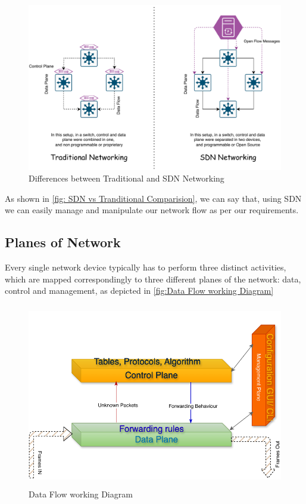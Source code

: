 \documentclass[12pt,letterpaper]{article}
\begin{document}
    \begin{figure}[h]
        \centering
        \includegraphics[height = 12 cm]{images/sndvtra.pdf}
        \caption{Differences between Traditional and SDN Networking}
        \label{fig: SDN vs Tranditional Comparision}
    \end{figure}

    As shown in \autoref{fig: SDN vs Tranditional Comparision}, we can say that, using SDN we can easily manage and manipulate our network flow as per our requirements.

    \subsection{Planes of Network}

    Every single network device typically has to perform three distinct activities, which are mapped correspondingly to three different planes of the network: data, control and management, as depicted in \autoref{fig:Data Flow working Diagram}

    \begin{figure}
        \centering
        \includegraphics[height= 8cm]{images/Data Flow Diagram.drawio.pdf}
        \caption{Data Flow working Diagram}
        \label{fig:Data Flow working Diagram}
    \end{figure}
\end{document}
